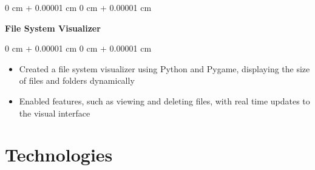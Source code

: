 \documentclass[10pt, letterpaper]{article}
\newenvironment{highlights}{
    \begin{itemize}[
        topsep=0.10 cm,
        parsep=0.10 cm,
        partopsep=0pt,
        itemsep=0pt,
        leftmargin=0 cm + 10pt
    ]
}{
    \end{itemize}
} %
\newenvironment{onecolentry}{
    \begin{adjustwidth}{
        0 cm + 0.00001 cm
    }{
        0 cm + 0.00001 cm
    }
}{
    \end{adjustwidth}
} %
\newenvironment{twocolentry}[2][]{
    \onecolentry
    \def\secondColumn{#2}
    \setcolumnwidth{\fill, 4.5 cm}
    \begin{paracol}{2}
}{
    \switchcolumn \raggedleft \secondColumn
    \end{paracol}
    \endonecolentry
} %
\begin{document}
    \vspace{0.2 cm}
    
    \begin{twocolentry}{}
        \textbf{File System Visualizer}
    \end{twocolentry}
    
    \vspace{0.10 cm}
    \begin{onecolentry}
        \begin{highlights}
            \item Created a file system visualizer using Python and Pygame, displaying the size of files and folders dynamically
            \item Enabled features, such as viewing and deleting files, with real time updates to the visual interface
        \end{highlights}
    \end{onecolentry}
    
    



    




    \section{Technologies}
    
    
       
    
\end{document}
